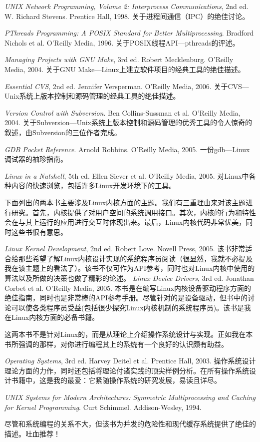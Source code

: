 \textit{UNIX Network Programming, Volume 2: Interprocess Communications}, 2nd ed.
   W. Richard Stevens. Prentice Hall, 1998.
    关于进程间通信（IPC）的绝佳讨论。

\textit{PThreads Programming: A POSIX Standard for Better Multiprocessing}. Bradford
   Nichols et al. O’Reilly Media, 1996.
    关于POSIX线程API---pthreads的评述。

\textit{Managing Projects with GNU Make}, 3rd ed. Robert Mecklenburg. O’Reilly Media,
   2004.
    关于GNU Make---Linux上建立软件项目的经典工具的绝佳描述。

\textit{Essential CVS}, 2nd ed. Jennifer Versperman. O’Reilly Media, 2006.
    关于CVS---Unix系统上版本控制和源码管理的经典工具的绝佳描述。

\textit{Version Control with Subversion}. Ben Collins-Sussman et al. O’Reilly Media, 2004.
    关于Subversion---Unix系统上版本控制和源码管理的优秀工具的令人惊奇的叙述，由Subversion的三位作者完成。

\textit{GDB Pocket Reference}. Arnold Robbins. O’Reilly Media, 2005.
    一份gdb---Linux调试器的袖珍指南。

\textit{Linux in a Nutshell}, 5th ed. Ellen Siever et al. O’Reilly Media, 2005.
    对Linux中各种内容的快速浏览，包括许多Linux开发环境下的工具。

下面列出的两本书主要涉及Linux内核方面的主题。我们有三重理由来对该主题进行研究。首先，内核提供了对用户空间的系统调用接口。其次，内核的行为和特性会在与其上运行的应用进行交互时体现出来。最后，Linux内核代码非常优美，同时这些书很有意思。

\textit{Linux Kernel Development}, 2nd ed. Robert Love. Novell Press, 2005.
    该书非常适合给那些希望了解Linux内核设计实现的系统程序员阅读（很显然，我就不必提及我在该主题上的看法了）。该书不仅可作为API参考，同时也对Linux内核中使用的算法以及所做的决策也做了精彩的论述。
\textit{Linux Device Drivers}, 3rd ed. Jonathan Corbet et al. O’Reilly Media, 2005.
    本书是在编写Linux内核设备驱动程序方面的绝佳指南，同时也是非常棒的API参考手册。尽管针对的是设备驱动，但书中的讨论可以使各类程序员受益(包括很少探究Linux内核机制的系统程序员)。该书是我在Linux内核方面的必备书籍。

这两本书不是针对Linux的，而是从理论上介绍操作系统设计与实现。正如我在本书所强调的那样，对你进行编程其上的系统有一个良好的认识颇有助益。

\textit{Operating Systems}, 3rd ed. Harvey Deitel et al. Prentice Hall, 2003.
    操作系统设计理论方面的力作，同时还包括将理论付诸实践的顶尖样例分析。在所有操作系统设计书籍中，这是我的最爱：它紧随操作系统的研究发展，易读且详尽。

\textit{UNIX Systems for Modern Architectures: Symmetric Multiprocessing and Caching for Kernel Programming}. Curt Schimmel. Addison-Wesley, 1994.
   
    尽管和系统编程的关系不大，但该书为并发的危险性和现代缓存系统提供了绝佳的描述。吐血推荐！




